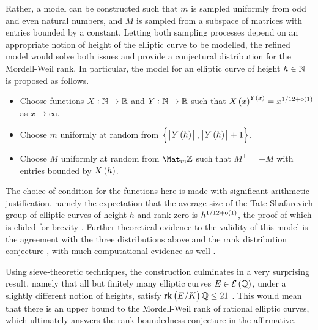 Rather, a model can be constructed such that $ m $ is sampled uniformly from odd and even natural numbers, and $ M $ is sampled from a subspace of matrices with entries bounded by a constant. Letting both sampling processes depend on an appropriate notion of height of the elliptic curve to be modelled, the refined model would solve both issues and provide a conjectural distribution for the Mordell-Weil rank. In particular, the model for an elliptic curve of height $ h \in \mathbb{N} $ is proposed as follows.
\begin{itemize}
\item Choose functions $ X : \mathbb{N} \to \mathbb{R} $ and $ Y : \mathbb{N} \to \mathbb{R} $ such that $ X\br{x}^{Y\br{x}} = x^{1 / 12 + \o\br{1}} $ as $ x \to \infty $.
\item Choose $ m $ uniformly at random from $ \cbr{\lbr{Y\br{h}}, \lbr{Y\br{h}} + 1} $.
\item Choose $ M $ uniformly at random from $ \Mat_m \ZZ $ such that $ M^\intercal = -M $ with entries bounded by $ X\br{h} $.
\end{itemize}
The choice of condition for the functions here is made with significant arithmetic justification, namely the expectation that the average size of the Tate-Shafarevich group of elliptic curves of height $ h $ and rank zero is $ h^{1 / 12 + \o\br{1}} $, the proof of which is elided for brevity \cite[Theorem 6.4.2(c)]{PPVW19}. Further theoretical evidence to the validity of this model is the agreement with the three distributions above and the rank distribution conjecture \cite[Section 8.1]{PPVW19}, with much computational evidence as well \cite[Section 10.1]{PPVW19}.

Using sieve-theoretic techniques, the construction culminates in a very surprising result, namely that all but finitely many elliptic curves $ E \in \EEE\br{\QQ} $, under a slightly different notion of heights, satisfy $ \rkE{\QQ} \le 21 $ \cite[Theorem 7.3.3(a)]{PPVW19}. This would mean that there is an upper bound to the Mordell-Weil rank of rational elliptic curves, which ultimately answers the rank boundedness conjecture in the affirmative.

\pagebreak

\printbibliography

